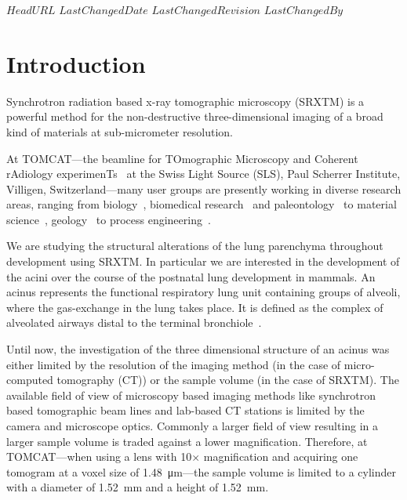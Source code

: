 \svnidlong
{$HeadURL$}
{$LastChangedDate$}
{$LastChangedRevision$}
{$LastChangedBy$}
%
%
\section{Introduction}

Synchrotron radiation based x-ray tomographic microscopy (SRXTM) is a powerful method for the non-destructive three-dimensional imaging of a broad kind of materials at sub-micrometer resolution.

At TOMCAT---the beamline for TOmographic Microscopy and Coherent rAdiology experimenTs~\cite{Stampanoni2007} at the Swiss Light Source (SLS), Paul Scherrer Institute, Villigen, Switzerland---many user groups are presently working in diverse research areas, ranging from biology~\cite{McDonald2009,PerezHuerta2009}, biomedical research~\cite{Schittny2008,Tsuda2008,Heinzer2008} and paleontology~\cite{Gostling2008,Friis2007,Hagadorn2006,Donoghue2006} to material science~\cite{Gallucci2007}, geology~\cite{Carminati2007} to process engineering~\cite{Davenport2007,Vaucher2007}.

We are studying the structural alterations of the lung parenchyma throughout development using SRXTM. In particular we are interested in the development of the acini over the course of the postnatal lung development in mammals. An acinus represents the functional respiratory lung unit containing groups of alveoli, where the gas-exchange in the lung takes place. It is defined as the complex of alveolated airways distal to the terminal bronchiole~\cite{Rodriguez1987}.

Until now, the investigation of the three dimensional structure of an acinus was either limited by the resolution of the imaging method (in the case of micro-computed tomography (\micro CT)) or the sample volume (in the case of SRXTM). The available field of view of microscopy based imaging methods like synchrotron based tomographic beam lines and lab-based \micro CT stations is limited by the camera and microscope optics. Commonly a larger field of view resulting in a larger sample volume is traded against a lower magnification. Therefore, at TOMCAT---when using a lens with 10$\times$ magnification and acquiring one tomogram at a voxel size of \SI{1.48}{\micro\meter}---the sample volume is limited to a cylinder with a diameter of \SI{1.52}{\milli\meter} and a height of \SI{1.52}{\milli\meter}.

